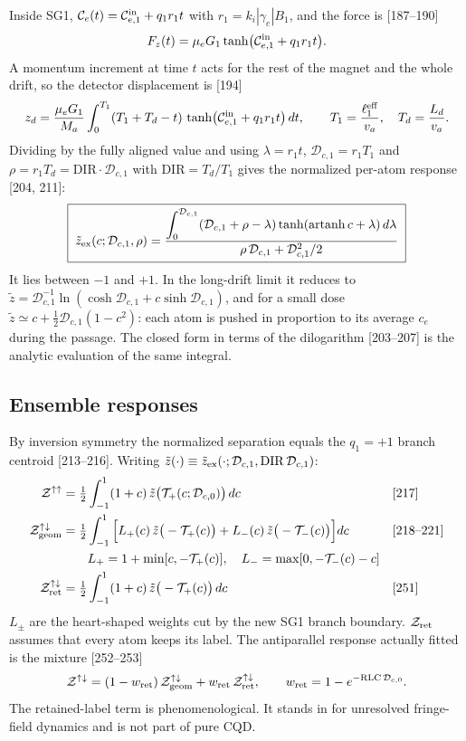 \documentclass[11pt,a4paper]{article}
\newcommand{\D}{\mathcal{D}}
\newcommand{\Z}{\mathcal{Z}}
\newcommand{\C}{\mathcal{C}}
\newcommand{\T}{\mathcal{T}}
\newcommand{\pp}{{\uparrow\uparrow}}
\newcommand{\pa}{{\uparrow\downarrow}}
\newcommand{\DIR}{\mathrm{DIR}}
\newcommand{\RLC}{\mathrm{RLC}}
\begin{document}
Inside SG1, $\C_e(t)=\C_{e,1}^{\rm in}+q_1r_1t$ with $r_1=k_i|\gamma_e|B_1$, and the force is
[187--190]
\begin{equation}
F_z(t)=\mu_eG_1\tanh\!\big(\C_{e,1}^{\rm in}+q_1r_1t\big).
\end{equation}
A momentum increment at time $t$ acts for the rest of the magnet and the whole drift, so the detector
displacement is [194]
\begin{equation}
z_d=\frac{\mu_eG_1}{M_a}\int_0^{T_1}(T_1+T_d-t)\,\tanh\!\big(\C_{e,1}^{\rm in}+q_1r_1t\big)\,dt,
\qquad T_1=\frac{\ell_1^{\rm eff}}{v_a},\quad T_d=\frac{L_d}{v_a}.
\end{equation}
Dividing by the fully aligned value and using $\lambda=r_1t$, $\D_{c,1}=r_1T_1$ and
$\rho=r_1T_d=\DIR\cdot\D_{c,1}$ with $\DIR=T_d/T_1$ gives the normalized per-atom response
[204, 211]:
\begin{equation}
\boxed{\;
\tilde z_{\rm ex}(c;\D_{c,1},\rho)=
\frac{\displaystyle\int_0^{\D_{c,1}}(\D_{c,1}+\rho-\lambda)\tanh(\operatorname{artanh}c+\lambda)\,d\lambda}
{\rho\,\D_{c,1}+\D_{c,1}^2/2}\;}
\label{eq:zex}
\end{equation}
It lies between $-1$ and $+1$. In the long-drift limit it reduces to
$\tilde z=\D_{c,1}^{-1}\ln(\cosh\D_{c,1}+c\sinh\D_{c,1})$, and for a small dose
$\tilde z\simeq c+\tfrac12\D_{c,1}(1-c^2)$: each atom is pushed in proportion to its average
$c_e$ during the passage. The closed form in terms of the dilogarithm [203--207] is the analytic
evaluation of the same integral.

\subsection{Ensemble responses}

By inversion symmetry the normalized separation equals the $q_1=+1$ branch centroid [213--216].
Writing $\tilde z(\cdot)\equiv\tilde z_{\rm ex}(\cdot;\D_{c,1},\DIR\,\D_{c,1})$:
\begin{align}
\Z^\pp&=\tfrac12\int_{-1}^{1}(1+c)\,\tilde z\big(\T_+(c;\D_{c,0})\big)\,dc
&&\text{[217]}\label{eq:Zpar}\\
\Z^\pa_{\rm geom}&=\tfrac12\int_{-1}^{1}\Big[L_+(c)\,\tilde z\big(-\T_+(c)\big)
+L_-(c)\,\tilde z\big(-\T_-(c)\big)\Big]dc
&&\text{[218--221]}\\
&\qquad L_+=1+\min[c,-\T_+(c)],\quad L_-=\max[0,-\T_-(c)-c]\nonumber\\
\Z^\pa_{\rm ret}&=\tfrac12\int_{-1}^{1}(1+c)\,\tilde z\big(-\T_+(c)\big)\,dc
&&\text{[251]}
\end{align}
$L_\pm$ are the heart-shaped weights cut by the new SG1 branch boundary. $\Z_{\rm ret}$ assumes that
every atom keeps its label. The antiparallel response actually fitted is the mixture [252--253]
\begin{equation}
\Z^\pa=(1-w_{\rm ret})\,\Z^\pa_{\rm geom}+w_{\rm ret}\,\Z^\pa_{\rm ret},\qquad
w_{\rm ret}=1-e^{-\RLC\,\D_{c,0}} .
\end{equation}
The retained-label term is phenomenological. It stands in for unresolved fringe-field dynamics and is
not part of pure CQD.
\end{document}
